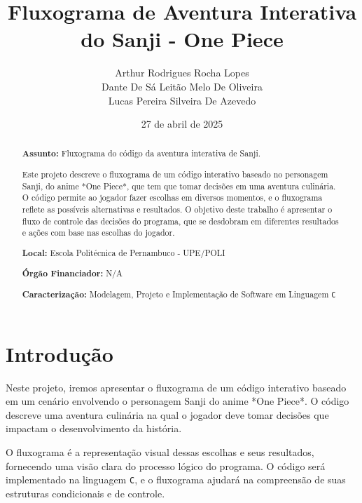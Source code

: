 \documentclass[a4paper,12pt]{article} %
\title{Fluxograma de Aventura Interativa do Sanji - One Piece}
\author{
    Arthur Rodrigues Rocha Lopes \\
    Dante De Sá Leitão Melo De Oliveira \\
    Lucas Pereira Silveira De Azevedo
}
\date{27 de abril de 2025}
\begin{document}
\maketitle


\begin{abstract}
\textbf{Assunto:} Fluxograma do código da aventura interativa de Sanji.

Este projeto descreve o fluxograma de um código interativo baseado no personagem Sanji, do anime *One Piece*, que tem que tomar decisões em uma aventura culinária. O código permite ao jogador fazer escolhas em diversos momentos, e o fluxograma reflete as possíveis alternativas e resultados. O objetivo deste trabalho é apresentar o fluxo de controle das decisões do programa, que se desdobram em diferentes resultados e ações com base nas escolhas do jogador.

\textbf{Local:} Escola Politécnica de Pernambuco - UPE/POLI

\textbf{Órgão Financiador:} N/A

\textbf{Caracterização:} Modelagem, Projeto e Implementação de Software em Linguagem \texttt{C}
\end{abstract}



\section{Introdução}

Neste projeto, iremos apresentar o fluxograma de um código interativo baseado em um cenário envolvendo o personagem Sanji do anime *One Piece*. O código descreve uma aventura culinária na qual o jogador deve tomar decisões que impactam o desenvolvimento da história.

O fluxograma é a representação visual dessas escolhas e seus resultados, fornecendo uma visão clara do processo lógico do programa. O código será implementado na linguagem \texttt{C}, e o fluxograma ajudará na compreensão de suas estruturas condicionais e de controle.

\end{document}
